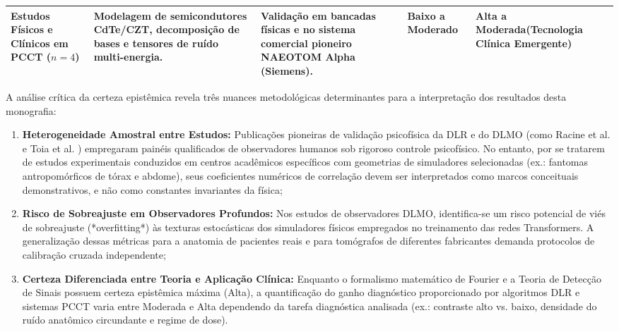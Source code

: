 \documentclass[
  12pt,
  a4paper,
  oneside
]{report}
\begin{document}
\begin{table}[htbp]
\begin{tabularx}{\textwidth}{>{\RaggedRight\bfseries}p{} >{\RaggedRight}p{} >{\RaggedRight}p{} >{\centering\arraybackslash}p{} >{\RaggedRight\arraybackslash}X}
    \addlinespace[0.5em]
    Estudos Físicos e Clínicos em PCCT ($n = 4$) \cite{willemink2018, rajendran2021, mccollough2026, pimenta2026} &
    Modelagem de semicondutores CdTe/CZT, decomposição de bases e tensores de ruído multi-energia. &
    Validação em bancadas físicas e no sistema comercial pioneiro NAEOTOM Alpha (Siemens). &
    \textbf{Baixo a Moderado} &
    \textbf{Alta a Moderada}\newline (Tecnologia Clínica Emergente) \\
    \bottomrule
  \end{tabularx}
  \vspace{0.3em}\par{}
\end{table}

A análise crítica da certeza epistêmica revela três nuances metodológicas determinantes para a interpretação dos resultados desta monografia:
\begin{enumerate}
  \item \textbf{Heterogeneidade Amostral entre Estudos:} Publicações pioneiras de validação psicofísica da DLR e do DLMO (como Racine et al. \cite{racine2021} e Toia et al. \cite{toia2023}) empregaram painéis qualificados de observadores humanos sob rigoroso controle psicofísico. No entanto, por se tratarem de estudos experimentais conduzidos em centros acadêmicos específicos com geometrias de simuladores selecionadas (ex.: fantomas antropomórficos de tórax e abdome), seus coeficientes numéricos de correlação devem ser interpretados como marcos conceituais demonstrativos, e não como constantes invariantes da física;
  \item \textbf{Risco de Sobreajuste em Observadores Profundos:} Nos estudos de observadores DLMO, identifica-se um risco potencial de viés de sobreajuste (*overfitting*) às texturas estocásticas dos simuladores físicos empregados no treinamento das redes Transformers. A generalização dessas métricas para a anatomia de pacientes reais e para tomógrafos de diferentes fabricantes demanda protocolos de calibração cruzada independente;
  \item \textbf{Certeza Diferenciada entre Teoria e Aplicação Clínica:} Enquanto o formalismo matemático de Fourier e a Teoria de Detecção de Sinais possuem certeza epistêmica máxima (Alta), a quantificação do ganho diagnóstico proporcionado por algoritmos DLR e sistemas PCCT varia entre Moderada e Alta dependendo da tarefa diagnóstica analisada (ex.: contraste alto vs. baixo, densidade do ruído anatômico circundante e regime de dose).
\end{enumerate}
\end{document}

